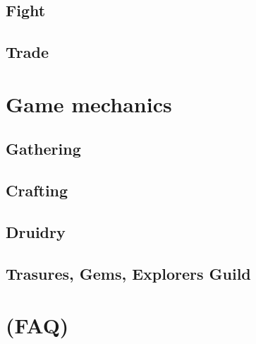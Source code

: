 \documentclass[a4paper,11pt]{scrreprt}
\begin{document}
\section{Fight}
\section{Trade}
\section{}

\chapter{Game mechanics}
\section{Gathering}
\section{Crafting}
\section{Druidry}
\section{Trasures, Gems, Explorers Guild}

\chapter{(FAQ)}
\end{document}
